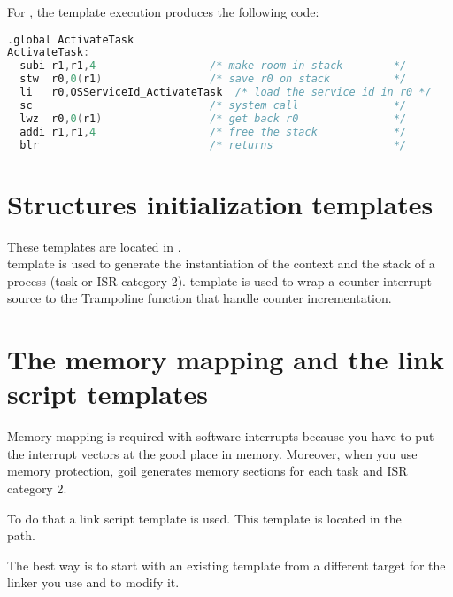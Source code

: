 For , the template execution produces the following code:

\begin{lstlisting}[language=C]
  .global ActivateTask
ActivateTask:
  subi r1,r1,4                  /* make room in stack        */
  stw  r0,0(r1)                 /* save r0 on stack          */
  li   r0,OSServiceId_ActivateTask  /* load the service id in r0 */
  sc                            /* system call               */
  lwz  r0,0(r1)                 /* get back r0               */
  addi r1,r1,4                  /* free the stack            */
  blr                           /* returns                   */
\end{lstlisting}

\section{Structures initialization templates}

These templates are located in .\\ template  is used to generate the instantiation of the context and the stack of a process (task or ISR category 2). template  is used to wrap a counter interrupt source to the Trampoline function that handle counter incrementation.

\section{The memory mapping and the link script templates}

Memory mapping is required with software interrupts because you have to put the interrupt vectors at the good place in memory. Moreover, when you use memory protection, goil generates memory sections for each task and ISR category 2.

To do that a link script template is used. This template is located in the\\  path.

The best way is to start with an existing template from a different target for the linker you use and to modify it.